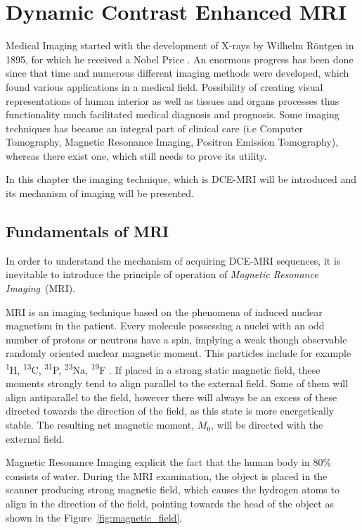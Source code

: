 \chapter{Dynamic Contrast Enhanced MRI}
	
Medical Imaging started with the development of X-rays by Wilhelm Röntgen in 1895, for which he received a Nobel Price \cite{rontgen1896new}. 
An enormous progress has been done since that time and numerous different imaging methods were developed, which found various applications in a medical field. Possibility of creating  visual representations of human interior as well as tissues and organs processes thus functionality much facilitated medical diagnosis and prognosis.   
Some imaging techniques has became an integral part of clinical care (i.e Computer Tomography, Magnetic Resonance Imaging, Positron Emission Tomography), whereas there exist one, which still needs to prove its utility. 

In this chapter the imaging technique, which is DCE-MRI will be introduced and its mechanism of imaging will be presented.

\section{Fundamentals of MRI}
In order to understand the mechanism of acquiring DCE-MRI sequences, it is inevitable to introduce the principle of operation of \textit{Magnetic Resonance Imaging}~(MRI).

MRI is an imaging technique based on the phenomena of induced nuclear  magnetism in the patient. Every molecule possessing a nuclei with an odd number of protons or neutrons  have a spin, implying a weak though observable randomly oriented nuclear magnetic moment. 
This particles include for example \textsuperscript{1}H, \textsuperscript{13}C, \textsuperscript{31}P, \textsuperscript{23}Na, \textsuperscript{19}F \nocite{bronzino1999biomedical}\cite{biomedical_hanbook_imaging}. If placed in a strong static magnetic field, these moments strongly tend to align parallel to the external field. Some of them will align antiparallel to the field, however there will always be an excess of these directed towards the direction of the field, as this state is more energetically stable. The resulting net magnetic moment, $M_0$, will be directed with the external field.

Magnetic Resonance Imaging explicit the fact that the human body in 80\% consists of water. During the MRI examination, the object is placed in the scanner producing strong magnetic field, which causes the hydrogen atoms to align in the direction of the field, pointing towards the head of the object as shown in the Figure~\ref{fig:magnetic_field}. 

